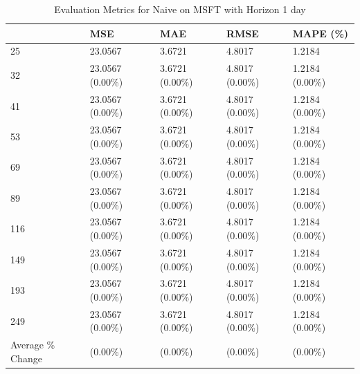 \begin{table}
\caption{Evaluation Metrics for Naive on MSFT with Horizon 1 day}
\label{tab:naive_MSFT_h1_metrics}
\begin{tabular}{lllll}
\toprule
 & MSE & MAE & RMSE & MAPE (\%) \\
\midrule
25 & 23.0567 & 3.6721 & 4.8017 & 1.2184 \\
32 & 23.0567 (0.00\%) & 3.6721 (0.00\%) & 4.8017 (0.00\%) & 1.2184 (0.00\%) \\
41 & 23.0567 (0.00\%) & 3.6721 (0.00\%) & 4.8017 (0.00\%) & 1.2184 (0.00\%) \\
53 & 23.0567 (0.00\%) & 3.6721 (0.00\%) & 4.8017 (0.00\%) & 1.2184 (0.00\%) \\
69 & 23.0567 (0.00\%) & 3.6721 (0.00\%) & 4.8017 (0.00\%) & 1.2184 (0.00\%) \\
89 & 23.0567 (0.00\%) & 3.6721 (0.00\%) & 4.8017 (0.00\%) & 1.2184 (0.00\%) \\
116 & 23.0567 (0.00\%) & 3.6721 (0.00\%) & 4.8017 (0.00\%) & 1.2184 (0.00\%) \\
149 & 23.0567 (0.00\%) & 3.6721 (0.00\%) & 4.8017 (0.00\%) & 1.2184 (0.00\%) \\
193 & 23.0567 (0.00\%) & 3.6721 (0.00\%) & 4.8017 (0.00\%) & 1.2184 (0.00\%) \\
249 & 23.0567 (0.00\%) & 3.6721 (0.00\%) & 4.8017 (0.00\%) & 1.2184 (0.00\%) \\
Average \% Change & (0.00\%) & (0.00\%) & (0.00\%) & (0.00\%) \\
\bottomrule
\end{tabular}
\end{table}
